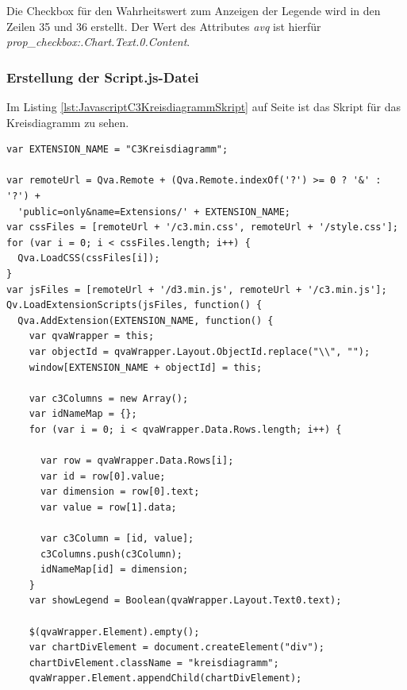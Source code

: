 Die Checkbox für den Wahrheits\-wert zum Anzeigen der Legende wird in den Zeilen 35 und 36 erstellt. Der Wert des Attributes \textit{avq} ist hierfür \textit{prop\_checkbox:.Chart.Text.0.Content}.

\subsubsection{Erstellung der Script.js-Datei}
\label{lab:ErstellungDerScriptJsDateiQvEoJs} 

Im Listing \ref{lst:JavascriptC3KreisdiagrammSkript} auf Seite \pageref{lst:JavascriptC3KreisdiagrammSkript} ist das Skript für das Kreisdiagramm zu sehen.


\ifIncludeFigures\begin{listing}[htbp]
\begin{verbatim}
var EXTENSION_NAME = "C3Kreisdiagramm";

var remoteUrl = Qva.Remote + (Qva.Remote.indexOf('?') >= 0 ? '&' : '?') +
  'public=only&name=Extensions/' + EXTENSION_NAME;
var cssFiles = [remoteUrl + '/c3.min.css', remoteUrl + '/style.css'];
for (var i = 0; i < cssFiles.length; i++) {
  Qva.LoadCSS(cssFiles[i]);
}
var jsFiles = [remoteUrl + '/d3.min.js', remoteUrl + '/c3.min.js'];
Qv.LoadExtensionScripts(jsFiles, function() {
  Qva.AddExtension(EXTENSION_NAME, function() {
    var qvaWrapper = this;
    var objectId = qvaWrapper.Layout.ObjectId.replace("\\", "");
    window[EXTENSION_NAME + objectId] = this;

    var c3Columns = new Array();
    var idNameMap = {};
    for (var i = 0; i < qvaWrapper.Data.Rows.length; i++) {

      var row = qvaWrapper.Data.Rows[i];
      var id = row[0].value;
      var dimension = row[0].text;
      var value = row[1].data;

      var c3Column = [id, value];
      c3Columns.push(c3Column);
      idNameMap[id] = dimension;
    }
    var showLegend = Boolean(qvaWrapper.Layout.Text0.text);

    $(qvaWrapper.Element).empty();
    var chartDivElement = document.createElement("div");
    chartDivElement.className = "kreisdiagramm";
    qvaWrapper.Element.appendChild(chartDivElement);


\end{verbatim}
\end{listing}
